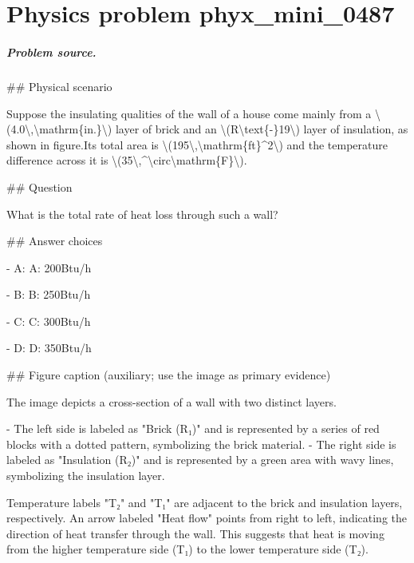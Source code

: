 
\chapter{Physics problem phyx\_mini\_0487}
\label{ch:PhyXMiniProblems_problem_phyx_mini_0487}

\paragraph{Problem source.}
\#\# Physical scenario

Suppose the insulating qualities of the wall of a house come mainly from a \textbackslash{}(4.0\textbackslash{},\textbackslash{}mathrm\{in.\}\textbackslash{}) layer of brick and an \textbackslash{}(R\textbackslash{}text\{-\}19\textbackslash{}) layer of insulation, as shown in figure.Its total area is \textbackslash{}(195\textbackslash{},\textbackslash{}mathrm\{ft\}\textasciicircum{}2\textbackslash{}) and the temperature difference across it is \textbackslash{}(35\textbackslash{},\textasciicircum{}\textbackslash{}circ\textbackslash{}mathrm\{F\}\textbackslash{}).

\#\# Question

What is the total rate of heat loss through such a wall?

\#\# Answer choices

- A: A: 200Btu/h

- B: B: 250Btu/h

- C: C: 300Btu/h

- D: D: 350Btu/h

\#\# Figure caption (auxiliary; use the image as primary evidence)

The image depicts a cross-section of a wall with two distinct layers. 

- The left side is labeled as "Brick (R₁)" and is represented by a series of red blocks with a dotted pattern, symbolizing the brick material. 
- The right side is labeled as "Insulation (R₂)" and is represented by a green area with wavy lines, symbolizing the insulation layer.

Temperature labels "T₂" and "T₁" are adjacent to the brick and insulation layers, respectively. An arrow labeled "Heat flow" points from right to left, indicating the direction of heat transfer through the wall. This suggests that heat is moving from the higher temperature side (T₁) to the lower temperature side (T₂).

